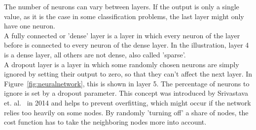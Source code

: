 \documentclass[
a4paper,
pagesize,
pdftex,
12pt,
twoside, %
BCOR=5mm, %
ngerman,
fleqn,
final,
]{scrartcl}
\begin{document}
	The number of neurons can vary between layers. If the output is only a single value, as it is the case in some classification problems, the last layer might only have one neuron.\\
	A fully connected or 'dense' layer is a layer in which every neuron of the layer before is connected to every neuron of the dense layer. In the illustration, layer 4 is a dense layer, all others are not dense, also called 'sparse'.\\
	A dropout layer is a layer in which some randomly chosen neurons are simply ignored by setting their output to zero, so that they can't affect the next layer. In Figure~\ref{fig:neuralnetwork}, this is shown in layer 5. The percentage of neurons to ignore is set by a dropout parameter. This concept was introduced by Srivastava et. al.~\cite{Srivastava.2014} in 2014 and helps to prevent overfitting, which might occur if the network relies too heavily on some nodes. By randomly 'turning off' a share of nodes, the cost function has to take the neighboring nodes more into account.\\

	
\end{document}
